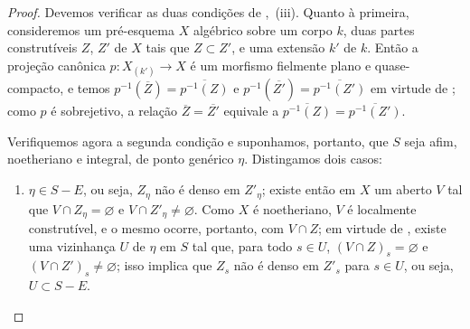 \begin{proof}
Devemos verificar as duas condições de ,~(iii).
Quanto à primeira, consideremos um pré-esquema $X$ algébrico sobre um corpo $k$, duas partes construtíveis $Z$, $Z'$ de $X$ tais que $Z\subset Z'$, e uma extensão $k'$ de $k$.
Então a projeção canônica $p:X_{(k')}\to X$ é um morfismo fielmente plano e quase-compacto, e temos $p^{-1}(\overline{Z})=\overline{p^{-1}(Z)}$ e $p^{-1}(\overline{Z'})=\overline{p^{-1}(Z')}$ em virtude de ; como $p$ é sobrejetivo, a relação $\overline{Z}=\overline{Z'}$ equivale a $\overline{p^{-1}(Z)}=\overline{p^{-1}(Z')}$.

Verifiquemos agora a segunda condição e suponhamos, portanto, que $S$ seja afim, noetheriano e integral, de ponto genérico $\eta$.
Distingamos dois casos:
\begin{enumerate}[label=\upshape{$\arabic{enumi}^\circ$}]
  \item $\eta\in S-E$, ou seja, $Z_\eta$ não é denso em $Z'_\eta$; existe então em $X$ um aberto $V$ tal que $V\cap Z_\eta=\varnothing$ e $V\cap Z'_\eta\neq\varnothing$.
  Como $X$ é noetheriano, $V$ é localmente construtível, e o mesmo ocorre, portanto, com $V\cap Z$; em virtude de , existe uma vizinhança $U$ de $\eta$ em $S$ tal que, para todo $s\in U$, $(V\cap Z)_s=\varnothing$ e $(V\cap Z')_s\neq\varnothing$; isso implica que $Z_s$ não é denso em $Z'_s$ para $s\in U$, ou seja, $U\subset S-E$.



\end{enumerate}
\end{proof}

